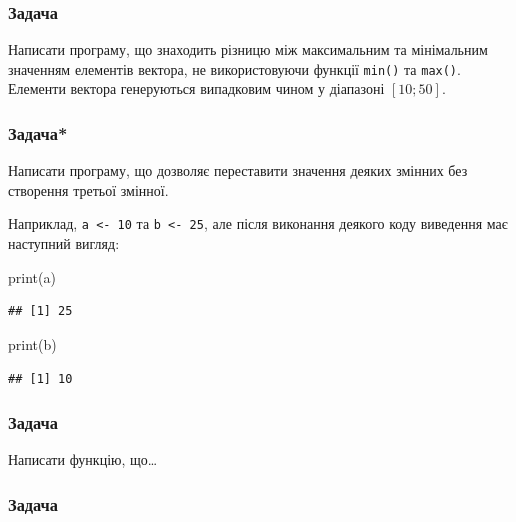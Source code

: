 \documentclass[
]{book}
\newenvironment{Shaded}{\begin{snugshade}}{\end{snugshade}}
\newcommand{\FunctionTok}[1]{\textcolor[rgb]{0.00,0.00,0.00}{#1}}
\newcommand{\NormalTok}[1]{#1}
\begin{document}
\hypertarget{task61211}{%
\subsubsection{Задача}\label{task61211}}

Написати програму, що знаходить різницю між максимальним та мінімальним значенням елементів вектора, не використовуючи функції \texttt{min()} та \texttt{max()}. Елементи вектора генеруються випадковим чином у діапазоні \([10;50]\).

\hypertarget{task6122}{%
\subsubsection{Задача*}\label{task6122}}

Написати програму, що дозволяє переставити значення деяких змінних без створення третьої змінної.

Наприклад, \texttt{a\ \textless{}-\ 10} та \texttt{b\ \textless{}-\ 25}, але після виконання деякого коду виведення має наступний вигляд:

\begin{Shaded}
\begin{Highlighting}[]
\FunctionTok{print}\NormalTok{(a)}
\end{Highlighting}
\end{Shaded}

\begin{verbatim}
## [1] 25
\end{verbatim}

\begin{Shaded}
\begin{Highlighting}[]
\FunctionTok{print}\NormalTok{(b)}
\end{Highlighting}
\end{Shaded}

\begin{verbatim}
## [1] 10
\end{verbatim}

\hypertarget{task6123}{%
\subsubsection{Задача}\label{task6123}}

Написати функцію, що\ldots{}

\hypertarget{task6124}{%
\subsubsection{Задача}\label{task6124}}
\end{document}

